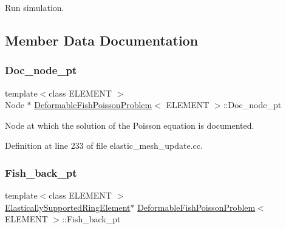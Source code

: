 Run simulation. 



\subsection{Member Data Documentation}
\mbox{\label{classDeformableFishPoissonProblem_acdb029d569c5ecefa5a71f2f099e7f27}} 
\subsubsection{\texorpdfstring{Doc\+\_\+node\+\_\+pt}{Doc\_node\_pt}}
{\footnotesize\ttfamily template$<$class E\+L\+E\+M\+E\+NT $>$ \\
Node $\ast$ \hyperlink{classDeformableFishPoissonProblem}{Deformable\+Fish\+Poisson\+Problem}$<$ E\+L\+E\+M\+E\+NT $>$\+::Doc\+\_\+node\+\_\+pt\hspace{0.3cm}{\ttfamily [private]}}



Node at which the solution of the Poisson equation is documented. 



Definition at line 233 of file elastic\+\_\+mesh\+\_\+update.\+cc.

\mbox{\label{classDeformableFishPoissonProblem_aaf5e3c5b0fc0e299b56f3d10d6dcbe20}} 
\subsubsection{\texorpdfstring{Fish\+\_\+back\+\_\+pt}{Fish\_back\_pt}\hspace{0.1cm}{\footnotesize\ttfamily [1/2]}}
{\footnotesize\ttfamily template$<$class E\+L\+E\+M\+E\+NT $>$ \\
\hyperlink{classoomph_1_1ElasticallySupportedRingElement}{Elastically\+Supported\+Ring\+Element}$\ast$ \hyperlink{classDeformableFishPoissonProblem}{Deformable\+Fish\+Poisson\+Problem}$<$ E\+L\+E\+M\+E\+NT $>$\+::Fish\+\_\+back\+\_\+pt\hspace{0.3cm}{\ttfamily [private]}}



